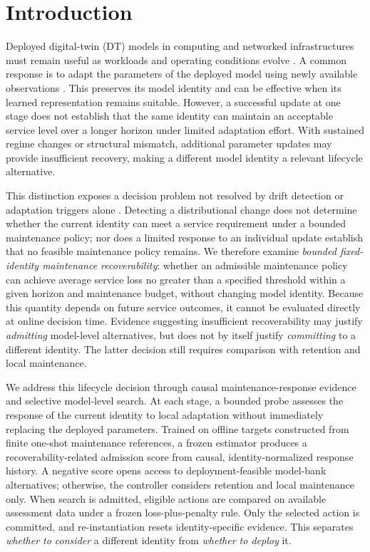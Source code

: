 \documentclass[journal]{IEEEtran}
\begin{document}
\section{Introduction}
\label{sec:intro}
Deployed digital-twin (DT) models in computing and networked infrastructures must remain useful as workloads and operating conditions evolve \cite{Sharma2022,Mihai2022,Xu2023,Tang2022,Qin2024}. A common response is to adapt the parameters of the deployed model using newly available observations \cite{Tao2026,Luo2025,Wang2024CL}. This preserves its model identity and can be effective when its learned representation remains suitable. However, a successful update at one stage does not establish that the same identity can maintain an acceptable service level over a longer horizon under limited adaptation effort. With sustained regime changes or structural mismatch, additional parameter updates may provide insufficient recovery, making a different model identity a relevant lifecycle alternative.

This distinction exposes a decision problem not resolved by drift detection or adaptation triggers alone \cite{Zhang2023OneNet,Kim2022RevIN,Liu2022NST}. Detecting a distributional change does not determine whether the current identity can meet a service requirement under a bounded maintenance policy; nor does a limited response to an individual update establish that no feasible maintenance policy remains. We therefore examine \emph{bounded fixed-identity maintenance recoverability}: whether an admissible maintenance policy can achieve average service loss no greater than a specified threshold within a given horizon and maintenance budget, without changing model identity. Because this quantity depends on future service outcomes, it cannot be evaluated directly at online decision time. Evidence suggesting insufficient recoverability may justify \emph{admitting} model-level alternatives, but does not by itself justify \emph{committing} to a different identity. The latter decision still requires comparison with retention and local maintenance.

We address this lifecycle decision through causal maintenance-response evidence and selective model-level search. At each stage, a bounded probe assesses the response of the current identity to local adaptation without immediately replacing the deployed parameters. Trained on offline targets constructed from finite one-shot maintenance references, a frozen estimator produces a recoverability-related admission score from causal, identity-normalized response history. A negative score opens access to deployment-feasible model-bank alternatives; otherwise, the controller considers retention and local maintenance only. When search is admitted, eligible actions are compared on available assessment data under a frozen loss-plus-penalty rule. Only the selected action is committed, and re-instantiation resets identity-specific evidence. This separates \emph{whether to consider} a different identity from \emph{whether to deploy} it.
\end{document}
